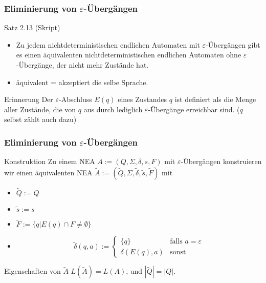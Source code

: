 \documentclass{beamer}
\begin{document}
\begin{frame}
	\frametitle{Eliminierung von $\varepsilon$-Übergängen}
	\begin{block}{Satz 2.13 (Skript)}
	\begin{itemize}
	 \item Zu jedem nichtdeterministischen endlichen Automaten mit \(\varepsilon\)-Übergängen gibt es einen äquivalenten nichtdeterministischen
	 endlichen Automaten ohne \(\varepsilon\)-Übergänge, der nicht mehr Zustände hat.
	 \item äquivalent = akzeptiert die selbe Sprache.
	\end{itemize}
	\end{block}
	\begin{block}{Erinnerung}
		Der \(\varepsilon\)-Abschluss $E(q)$ eines Zustandes $q$ ist definiert als die Menge aller Zustände, die von $q$ aus durch lediglich \(\varepsilon\)-Übergänge erreichbar sind. ($q$ selbst zählt auch dazu)
	\end{block}
\end{frame}
\begin{frame}
\frametitle{Eliminierung von $\varepsilon$-Übergängen}
	\begin{block}{Konstruktion}
	Zu einem NEA \(A := (Q, \Sigma, \delta, s, F)\) mit \(\varepsilon\)-Übergängen konstruieren wir einen 
	  äquivalenten NEA \(\tilde{A} := (\tilde{Q}, \Sigma, \tilde{\delta}, \tilde{s}, \tilde{F})\) mit
	 \begin{itemize}
	 \item \(\tilde{Q} := Q\)
	 \item \(\tilde{s} := s\)
	 \item \(\tilde{F} := \{q|E(q)\cap F \neq \emptyset\}\)
	 \item \[\tilde{\delta}(q,a) := 
	 \begin{cases}
	  \{q\}			& \text{falls $a = \varepsilon$} \\
	 \delta(E(q),a)	& \text{sonst}
	 \end{cases}\]
	 \end{itemize}
	\end{block}
	\begin{block}{Eigenschaften von \(\tilde{A}\)}
	 \(L(\tilde{A}) = L(A)\), und \(|\tilde{Q}| = |Q|\).
	\end{block}

\end{frame}
\end{document}
